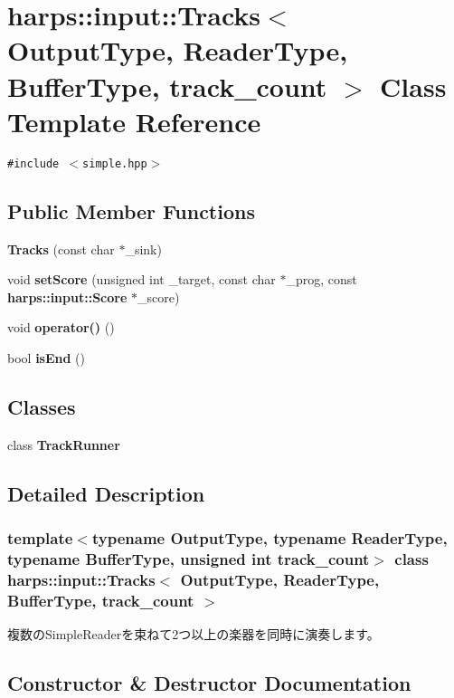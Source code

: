 \section{harps::input::Tracks$<$ OutputType, ReaderType, BufferType, track\_\-count $>$ Class Template Reference}
\label{classharps_1_1input_1_1Tracks}
{\tt \#include $<$simple.hpp$>$}

\subsection*{Public Member Functions}
\begin{CompactItemize}
\item 
{\bf Tracks} (const char $\ast$\_\-sink)
\item 
void \textbf{setScore} (unsigned int \_\-target, const char $\ast$\_\-prog, const {\bf harps::input::Score} $\ast$\_\-score)\label{classharps_1_1input_1_1Tracks_194d2399ae3cb04e0c8cf231f03a2265}

\item 
void {\bf operator()} ()
\item 
bool {\bf isEnd} ()
\end{CompactItemize}
\subsection*{Classes}
\begin{CompactItemize}
\item 
class \textbf{TrackRunner}
\end{CompactItemize}


\subsection{Detailed Description}
\subsubsection*{template$<$typename OutputType, typename ReaderType, typename BufferType, unsigned int track\_\-count$>$ class harps::input::Tracks$<$ OutputType, ReaderType, BufferType, track\_\-count $>$}

複数のSimpleReaderを束ねて2つ以上の楽器を同時に演奏します。 

\subsection{Constructor \& Destructor Documentation}

